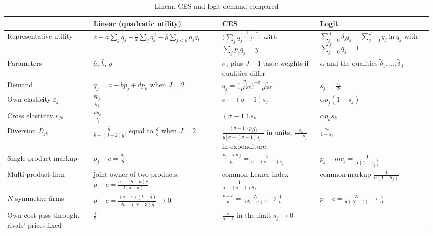 \begin{table}[htbp]
\centering
\caption{Linear, CES and logit demand compared}\label{tab:04-ces-logit-linear}
\footnotesize
\renewcommand{\arraystretch}{1.55}
\begin{tabularx}{\textwidth}{@{}>{\raggedright\arraybackslash}p{2.35cm}>{\raggedright\arraybackslash}X>{\raggedright\arraybackslash}X>{\raggedright\arraybackslash}X@{}}
\toprule
 & Linear (quadratic utility) & CES & Logit \\
\midrule
Representative utility
 & $z + \bar a\sum_jq_j - \frac{\bar b}{2}\sum_jq_j^2 - \bar g\sum_{j<k}q_jq_k$
 & $\big(\sum_jq_j^{\frac{\sigma-1}{\sigma}}\big)^{\frac{\sigma}{\sigma-1}}$ with $\sum_jp_jq_j = y$
 & $\sum_{j=0}^J\delta_jq_j - \sum_{j=0}^Jq_j\ln q_j$ with $\sum_{j=0}^Jq_j = 1$ \\
Parameters
 & $\bar a$, $\bar b$, $\bar g$
 & $\sigma$, plus $J - 1$ taste weights if qualities differ
 & $\alpha$ and the qualities $\tilde\delta_1, \dots, \tilde\delta_J$ \\
Demand
 & $q_j = a - bp_j + dp_k$ when $J = 2$
 & $q_j = \big(\frac{p_j}{P^{CES}}\big)^{-\sigma}\frac{y}{P^{CES}}$
 & $s_j = \frac{e^{\delta_j}}{\Phi}$ \\
Own elasticity $\varepsilon_j$
 & $\frac{bp_j}{q_j}$
 & $\sigma - (\sigma - 1)s_j$
 & $\alpha p_j(1 - s_j)$ \\
Cross elasticity $\varepsilon_{jk}$
 & $\frac{dp_k}{q_j}$
 & $(\sigma - 1)s_k$
 & $\alpha p_ks_k$ \\
Diversion $D_{jk}$
 & $\frac{\bar g}{\bar b + (J-2)\bar g}$, equal to $\frac{d}{b}$ when $J = 2$
 & $\frac{(\sigma-1)p_jq_k}{y[\sigma - (\sigma-1)s_j]}$ in units, $\frac{s_k}{1 - s_j}$ in expenditure
 & $\frac{s_k}{1 - s_j}$ \\
Single-product markup
 & $p_j - c = \frac{q_j}{b}$
 & $\frac{p_j - mc_j}{p_j} = \frac{1}{\sigma - (\sigma - 1)s_j}$
 & $p_j - mc_j = \frac{1}{\alpha(1 - s_j)}$ \\
Multi-product firm
 & joint owner of two products: $p - c = \frac{a - (b - d)c}{2(b - d)}$
 & common Lerner index $\frac{1}{\sigma - (\sigma - 1)S_f}$
 & common markup $\frac{1}{\alpha(1 - S_f)}$ \\
$N$ symmetric firms
 & $p - c = \frac{(\bar a - c)(\bar b - \bar g)}{2\bar b + (N-3)\bar g} \to 0$
 & $\frac{p - c}{p} = \frac{N}{\sigma N - \sigma + 1} \to \frac{1}{\sigma}$
 & $p - c = \frac{N}{\alpha(N - 1)} \to \frac{1}{\alpha}$ \\
Own-cost pass-through, rivals' prices fixed
 & $\frac{1}{2}$
 & $\frac{\sigma}{\sigma - 1}$ in the limit $s_j \to 0$

\end{tabularx}
\end{table}
